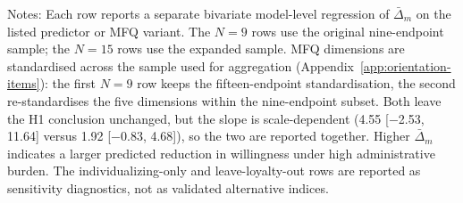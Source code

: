 \begin{table}[htbp]
\centering
\caption{H1 robustness across original and expanded model samples}
\label{tab:h1_expanded_robustness}
\begin{flushleft}
\footnotesize Notes: Each row reports a separate bivariate model-level regression of \(\bar{\Delta}_m\) on the listed predictor or MFQ variant. The \(N=9\) rows use the original nine-endpoint sample; the \(N=15\) rows use the expanded sample. MFQ dimensions are standardised across the sample used for aggregation (Appendix~\ref{app:orientation-items}): the first \(N=9\) row keeps the fifteen-endpoint standardisation, the second re-standardises the five dimensions within the nine-endpoint subset. Both leave the H1 conclusion unchanged, but the slope is scale-dependent (4.55 [$-$2.53, 11.64] versus 1.92 [$-$0.83, 4.68]), so the two are reported together. Higher \(\bar{\Delta}_m\) indicates a larger predicted reduction in willingness under high administrative burden. The individualizing-only and leave-loyalty-out rows are reported as sensitivity diagnostics, not as validated alternative indices.
\end{flushleft}
\end{table}
